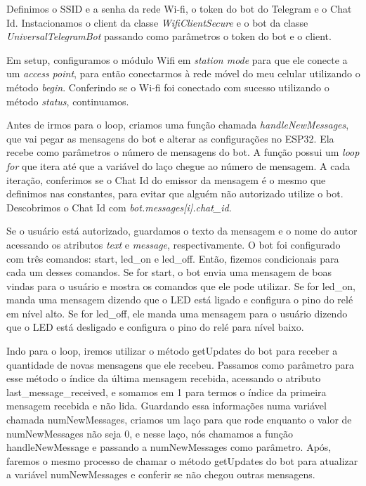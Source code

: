 \documentclass[12pt]{article}
\begin{document}
Definimos o SSID e a senha da rede Wi-fi, o token do bot do Telegram e o Chat Id. Instacionamos o client da classe \textit{WifiClientSecure} e o bot da classe \textit{UniversalTelegramBot} passando como parâmetros o token do bot e o client. 

Em setup, configuramos o módulo Wifi em \textit{station mode} para que ele conecte a um \textit{access point}, para então conectarmos à rede móvel do meu celular utilizando o método \textit{begin}. Conferindo se o Wi-fi foi conectado com sucesso utilizando o método \textit{status}, continuamos.

Antes de irmos para o loop, criamos uma função chamada \textit{handleNewMessages}, que vai pegar as mensagens do bot e alterar as configurações no ESP32. Ela recebe como parâmetros o número de mensagens do bot. A função possui um \textit{loop for} que itera até que a variável do laço chegue ao número de mensagem. A cada iteração, conferimos se o Chat Id do emissor da mensagem é o mesmo que definimos nas constantes, para evitar que alguém não autorizado utilize o bot. Descobrimos o Chat Id com \textit{bot.messages[i].chat\_id}.

Se o usuário está autorizado, guardamos o texto da mensagem e o nome do autor acessando os atributos \textit{text} e \textit{message}, respectivamente. O bot foi configurado com três comandos: start, led\_on e led\_off. Então, fizemos condicionais para cada um desses comandos. Se for start, o bot envia uma mensagem de boas vindas para o usuário e mostra os comandos que ele pode utilizar. Se for led\_on, manda uma mensagem dizendo que o LED está ligado e configura o pino do relé em nível alto. Se for led\_off, ele manda uma mensagem para o usuário dizendo que o LED está desligado e configura o pino do relé para nível baixo.

Indo para o loop, iremos utilizar o método getUpdates do bot para receber a quantidade de novas mensagens que ele recebeu. Passamos como parâmetro para esse método o índice da última mensagem recebida, acessando o atributo last\_message\_received, e somamos em 1 para termos o índice da primeira mensagem recebida e não lida. Guardando essa informações numa variável chamada numNewMessages, criamos um laço para que rode enquanto o valor de numNewMessages não seja 0, e nesse laço, nós chamamos a função handleNewMessage e passando a numNewMessages como parâmetro. Após, faremos o mesmo processo de chamar o método getUpdates do bot para atualizar a variável numNewMessages e conferir se não chegou outras mensagens.
\end{document}
